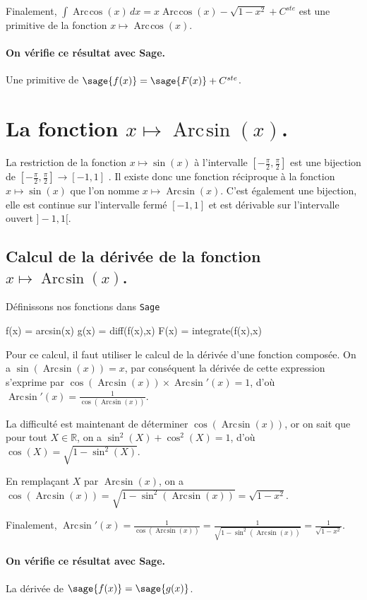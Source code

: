 \documentclass[a4paper,12pt]{report}
\def\eclaire{\mathbb}
\def\R{\ensuremath{\eclaire R}}
\renewcommand{\arcsin}{\mathop{\mathrm{Arc\mspace{2mu}sin}}}
\renewcommand{\arccos}{\mathop{\mathrm{Arc\mspace{2mu}cos}}}
\begin{document}
Finalement, $\int \arccos(x) \, dx = x  \arccos(x) - \sqrt{1- x^2} + C^{ste} $ est une primitive de la fonction $x \mapsto \arccos(x) $.
\paragraph{On vérifie ce résultat avec Sage.}
Une primitive de $\sage{f(x)} = \sage{F(x)} + C^{ste}$.


\section{La fonction  $x \mapsto \arcsin(x) $.}
La restriction de la fonction $x \mapsto \sin(x) $ à l'intervalle $\left[-\frac{\pi}{2},\frac{\pi}{2}\right]$ est une bijection de $\left[-\frac{\pi}{2},\frac{\pi}{2}\right] \rightarrow [-1,1]$ . Il existe donc une fonction réciproque à la fonction $x \mapsto \sin(x) $ que l'on nomme $x \mapsto \arcsin(x) $. C'est également une bijection, elle est continue sur l'intervalle fermé  $ [-1,1]$ et est dérivable sur l'intervalle ouvert $]-1,1[$.

\subsection{Calcul de la dérivée de la fonction $x \mapsto \arcsin(x) $.}
Définissons nos fonctions dans {\texttt{Sage}}
\begin{sageblock}
    f(x) = arcsin(x)
    g(x) = diff(f(x),x)
    F(x) = integrate(f(x),x)
\end{sageblock}

Pour ce calcul, il faut utiliser le calcul de la dérivée d'une fonction composée. On a $\sin(\arcsin(x))=x$, par conséquent la dérivée de cette expression s'exprime par $ \cos(\arcsin(x)) \times \arcsin\nolimits'(x) = 1$, d'où $\arcsin\nolimits'(x) = \frac{1}{\cos(\arcsin(x))} $.

La difficulté est maintenant de déterminer $\cos(\arcsin(x))$, or on sait que pour tout $X \in \R$, on a $\sin^2(X) + \cos^2(X) = 1$, d'où $\cos(X) = \sqrt{1-\sin^2(X)}$.

En remplaçant $X$ par $\arcsin(x)$, 
on a $\cos(\arcsin(x)) = \sqrt{1-\sin^2(\arcsin(x))} = \sqrt{1- x^2}$.

Finalement, $\arcsin\nolimits'(x)  = \frac{1}{\cos(\arcsin(x))}  = \frac{1}{\sqrt{1-\sin^2(\arcsin(x))}} =  \frac{1}{\sqrt{1- x^2}} $.
\paragraph{On vérifie ce résultat avec Sage.}
La dérivée de $\sage{f(x)} = \sage{g(x)} $.
\end{document}
